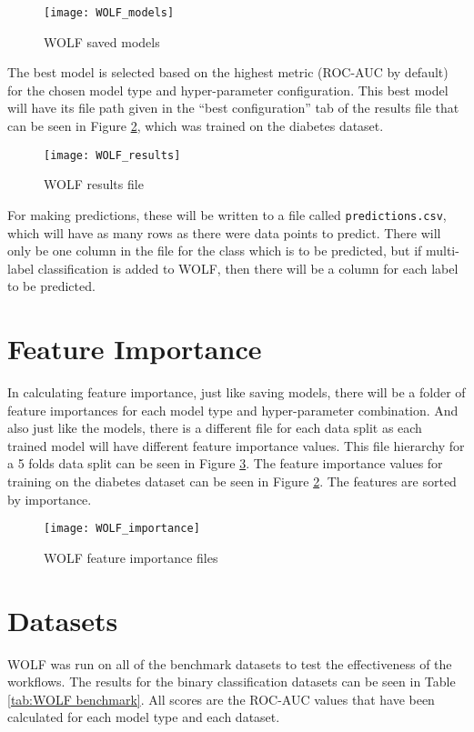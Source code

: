 \begin{figure}[H]
	\centering
	\texttt{[image: WOLF\_models]}
	\caption{WOLF saved models}
	\label{fig:WOLF saved models}
\end{figure}

The best model is selected based on the highest metric (ROC-AUC by default) for the chosen model type and hyper-parameter configuration. This best model will have its file path given in the ``best configuration'' tab of the results file that can be seen in Figure \ref{fig:WOLF results}, which was trained on the diabetes dataset.

\begin{figure}[H]
	\centering
	\texttt{[image: WOLF\_results]}
	\caption{WOLF results file}
	\label{fig:WOLF results}
\end{figure}

For making predictions, these will be written to a file called {\tt predictions.csv}, which will have as many rows as there were data points to predict. There will only be one column in the file for the class which is to be predicted, but if multi-label classification is added to WOLF, then there will be a column for each label to be predicted.

\section*{Feature Importance}
In calculating feature importance, just like saving models, there will be a folder of feature importances for each model type and hyper-parameter combination. And also just like the models, there is a different file for each data split as each trained model will have different feature importance values. This file hierarchy for a 5 folds data split can be seen in Figure \ref{fig:WOLF feature importances}. The feature importance values for training on the diabetes dataset can be seen in Figure \ref{fig:WOLF results}. The features are sorted by importance.

\begin{figure}[H]
	\centering
	\texttt{[image: WOLF\_importance]}
	\caption{WOLF feature importance files}
	\label{fig:WOLF feature importances}
\end{figure}

\section*{Datasets}
WOLF was run on all of the benchmark datasets to test the effectiveness of the workflows. The results for the binary classification datasets can be seen in Table \ref{tab:WOLF benchmark}. All scores are the ROC-AUC values that have been calculated for each model type and each dataset.

